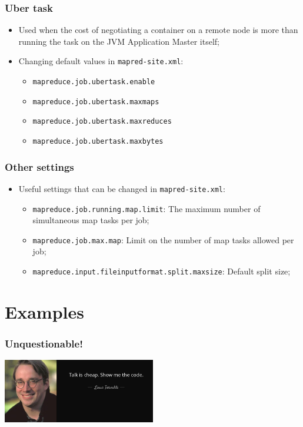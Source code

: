 \documentclass[aspectratio=169]{beamer}
\begin{document}
\begin{frame}
	\frametitle{Uber task}

	\begin{itemize}
	    \item Used when the cost of negotiating a container on a remote node is more than running the task on the JVM Application Master itself;
		\item Changing default values in \texttt{mapred-site.xml}:
		      \begin{itemize}
			      \item \texttt{mapreduce.job.ubertask.enable}
			      \item \texttt{mapreduce.job.ubertask.maxmaps}
			      \item \texttt{mapreduce.job.ubertask.maxreduces}
			      \item \texttt{mapreduce.job.ubertask.maxbytes}
		      \end{itemize}
	\end{itemize}
\end{frame}

\begin{frame}
	\frametitle{Other settings}

	\begin{itemize}
		\item Useful settings that can be changed in \texttt{mapred-site.xml}:
		      \begin{itemize}
			      \item \texttt{mapreduce.job.running.map.limit}: The maximum number of simultaneous map tasks per job;
			      \item \texttt{mapreduce.job.max.map}: Limit on the number of map tasks allowed per job;
			      \item \texttt{mapreduce.input.fileinputformat.split.maxsize}: Default split size;
		      \end{itemize}
	\end{itemize}
\end{frame}

\section{Examples}

\begin{frame}
	\frametitle{Unquestionable!}

	\begin{center}
		\includegraphics[height=1\textheight,width=0.5\textwidth,keepaspectratio]{./images/show-me-the-code.jpg}
	\end{center}
\end{frame}
\end{document}
